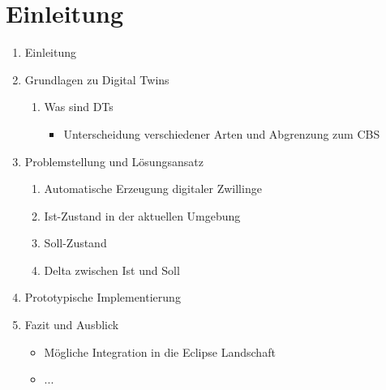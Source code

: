 \documentclass[
	12pt,
	BCOR=5mm,
	DIV=12,
	headinclude=on,
	footinclude=off,
	parskip=half,
	bibliography=totoc,
	listof=entryprefix,
	toc=listof,
	numbers=noenddot,
	plainfootsepline
]{scrreprt}
\begin{document}






\normalfont



\tableofcontents

\listoffigures

\listoftables




\clearpage
\ihead{\chaptername~\thechapter}
\ohead{\headmark}

\chapter{Einleitung}

\begin{enumerate}
	\item Einleitung
	\item Grundlagen zu Digital Twins
	\begin{enumerate}
		\item Was sind DTs
		\begin{itemize}
			\item Unterscheidung verschiedener Arten und Abgrenzung zum CBS
		\end{itemize}
	\end{enumerate}
	\item Problemstellung und Lösungsansatz
	\begin{enumerate}
		\item Automatische Erzeugung digitaler Zwillinge
		\item Ist-Zustand in der aktuellen Umgebung
		\item Soll-Zustand
		\item Delta zwischen Ist und Soll
	\end{enumerate}
	\item Prototypische Implementierung 
	\item Fazit und Ausblick
	\begin{itemize}
		\item Mögliche Integration in die Eclipse Landschaft
		\item ...
	\end{itemize}
\end{enumerate}
\end{document}
